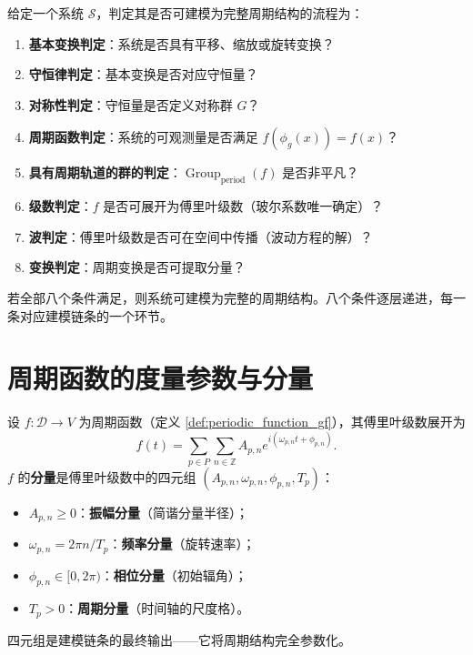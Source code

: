 \begin{remark}[周期结构的判定流程]\label{rem:periodic_structure_criterion}
给定一个系统 $\mathcal{S}$，判定其是否可建模为完整周期结构的流程为：
\begin{enumerate}[label=(\roman*)]
    \item \textbf{基本变换判定}：系统是否具有平移、缩放或旋转变换？
    \item \textbf{守恒律判定}：基本变换是否对应守恒量？
    \item \textbf{对称性判定}：守恒量是否定义对称群 $G$？
    \item \textbf{周期函数判定}：系统的可观测量是否满足 $f(\phi_g(x)) = f(x)$？
    \item \textbf{具有周期轨道的群的判定}：$\operatorname{Group}_{\mathrm{period}}(f)$ 是否非平凡？
    \item \textbf{级数判定}：$f$ 是否可展开为傅里叶级数（玻尔系数唯一确定）？
    \item \textbf{波判定}：傅里叶级数是否可在空间中传播（波动方程的解）？
    \item \textbf{变换判定}：周期变换是否可提取分量？
\end{enumerate}
若全部八个条件满足，则系统可建模为完整的周期结构。八个条件逐层递进，每一条对应建模链条的一个环节。
\end{remark}

\section{周期函数的度量参数与分量}

\begin{definition}[周期函数的度量参数与分量]\label{def:period_parameters}
设 $f: \mathcal{D} \to V$ 为周期函数（定义 \ref{def:periodic_function_gf}），其傅里叶级数展开为
\[
f(t) = \sum_{p \in P} \sum_{n \in \mathbb{Z}} A_{p,n} e^{i(\omega_{p,n} t + \phi_{p,n})}.
\]
$f$ 的\textbf{分量}是傅里叶级数中的四元组 $(A_{p,n}, \omega_{p,n}, \phi_{p,n}, T_p)$：
\begin{itemize}
    \item $A_{p,n} \ge 0$：\textbf{振幅分量}（简谐分量半径）；
    \item $\omega_{p,n} = 2\pi n / T_p$：\textbf{频率分量}（旋转速率）；
    \item $\phi_{p,n} \in [0, 2\pi)$：\textbf{相位分量}（初始辐角）；
    \item $T_p > 0$：\textbf{周期分量}（时间轴的尺度格）。
\end{itemize}
四元组是建模链条的最终输出——它将周期结构完全参数化。
\end{definition}

